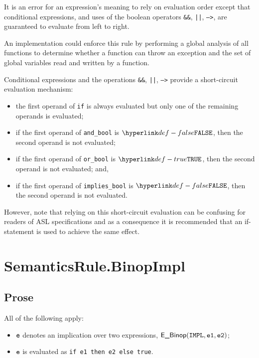 \documentclass{book}
\newcommand\veone[0]{\texttt{e1}}
\newcommand\vetwo[0]{\texttt{e2}}
\begin{document}
It is an error for an expression’s meaning to rely on
evaluation order except that conditional expressions, and uses of the boolean
operators \texttt{\&\&}, \texttt{||}, \texttt{-->}, are guaranteed to evaluate
from left to right.


An implementation could enforce this rule by performing a global analysis of
all functions to determine whether a function can throw an exception and the
set of global variables read and written by a function.

Conditional expressions and the operations \texttt{\&\&}, \texttt{||},
\texttt{-->} provide a short-circuit evaluation mechanism:

\begin{itemize}
\item the first operand of \texttt{if} is always evaluated but only one of the
remaining operands is evaluated;
\item if the first operand of \texttt{and\_bool} is $\False$, then the second operand is not evaluated;
\item if the first operand of \texttt{or\_bool} is $\True$, then the second operand is not evaluated; and,
\item if the first operand of \texttt{implies\_bool} is $\False$, then the
second operand is not evaluated.
\end{itemize}

However, note that relying on this short-circuit evaluation can be confusing
for readers of ASL specifications and as a consequence it is recommended that
an if-statement is used to achieve the same effect.

\section{SemanticsRule.BinopImpl \label{sec:SemanticsRule.BinopImpl}}
\subsection{Prose}
All of the following apply:
\begin{itemize}
  \item $\texttt{e}$ denotes an implication over two expressions, $\EBinop(\IMPL, \veone, \vetwo)$;
  \item $\texttt{e}$ is evaluated as \texttt{if e1 then e2 else true}.
\end{itemize}
\end{document}
